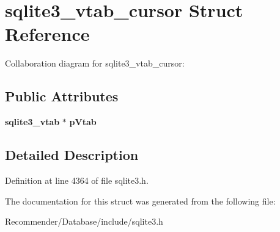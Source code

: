 \section{sqlite3\_\-vtab\_\-cursor Struct Reference}
\label{structsqlite3__vtab__cursor}
Collaboration diagram for sqlite3\_\-vtab\_\-cursor:\subsection*{Public Attributes}
\begin{CompactItemize}
\item 
{\bf sqlite3\_\-vtab} $\ast$ {\bf pVtab}\label{structsqlite3__vtab__cursor_bfe9b838cea369f3646c0bdff58a069e}

\end{CompactItemize}


\subsection{Detailed Description}




Definition at line 4364 of file sqlite3.h.

The documentation for this struct was generated from the following file:\begin{CompactItemize}
\item 
Recommender/Database/include/sqlite3.h\end{CompactItemize}
